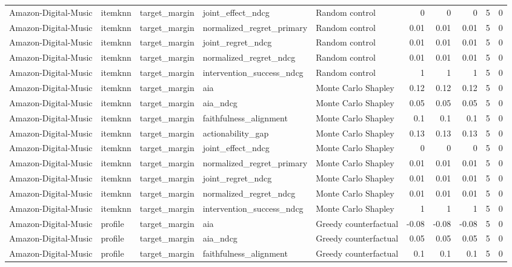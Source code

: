 \begin{table}[t]
{\begin{tabular}{lllllrrrrr}
Amazon-Digital-Music & itemknn & target\_margin & joint\_effect\_ndcg & Random control & 0 & 0 & 0 & 5 & 0 \\
Amazon-Digital-Music & itemknn & target\_margin & normalized\_regret\_primary & Random control & 0.01 & 0.01 & 0.01 & 5 & 0 \\
Amazon-Digital-Music & itemknn & target\_margin & joint\_regret\_ndcg & Random control & 0.01 & 0.01 & 0.01 & 5 & 0 \\
Amazon-Digital-Music & itemknn & target\_margin & normalized\_regret\_ndcg & Random control & 0.01 & 0.01 & 0.01 & 5 & 0 \\
Amazon-Digital-Music & itemknn & target\_margin & intervention\_success\_ndcg & Random control & 1 & 1 & 1 & 5 & 0 \\
Amazon-Digital-Music & itemknn & target\_margin & aia & Monte Carlo Shapley & 0.12 & 0.12 & 0.12 & 5 & 0 \\
Amazon-Digital-Music & itemknn & target\_margin & aia\_ndcg & Monte Carlo Shapley & 0.05 & 0.05 & 0.05 & 5 & 0 \\
Amazon-Digital-Music & itemknn & target\_margin & faithfulness\_alignment & Monte Carlo Shapley & 0.1 & 0.1 & 0.1 & 5 & 0 \\
Amazon-Digital-Music & itemknn & target\_margin & actionability\_gap & Monte Carlo Shapley & 0.13 & 0.13 & 0.13 & 5 & 0 \\
Amazon-Digital-Music & itemknn & target\_margin & joint\_effect\_ndcg & Monte Carlo Shapley & 0 & 0 & 0 & 5 & 0 \\
Amazon-Digital-Music & itemknn & target\_margin & normalized\_regret\_primary & Monte Carlo Shapley & 0.01 & 0.01 & 0.01 & 5 & 0 \\
Amazon-Digital-Music & itemknn & target\_margin & joint\_regret\_ndcg & Monte Carlo Shapley & 0.01 & 0.01 & 0.01 & 5 & 0 \\
Amazon-Digital-Music & itemknn & target\_margin & normalized\_regret\_ndcg & Monte Carlo Shapley & 0.01 & 0.01 & 0.01 & 5 & 0 \\
Amazon-Digital-Music & itemknn & target\_margin & intervention\_success\_ndcg & Monte Carlo Shapley & 1 & 1 & 1 & 5 & 0 \\
Amazon-Digital-Music & profile & target\_margin & aia & Greedy counterfactual & -0.08 & -0.08 & -0.08 & 5 & 0 \\
Amazon-Digital-Music & profile & target\_margin & aia\_ndcg & Greedy counterfactual & 0.05 & 0.05 & 0.05 & 5 & 0 \\
Amazon-Digital-Music & profile & target\_margin & faithfulness\_alignment & Greedy counterfactual & 0.1 & 0.1 & 0.1 & 5 & 0 \\

\end{tabular}}
\end{table}
